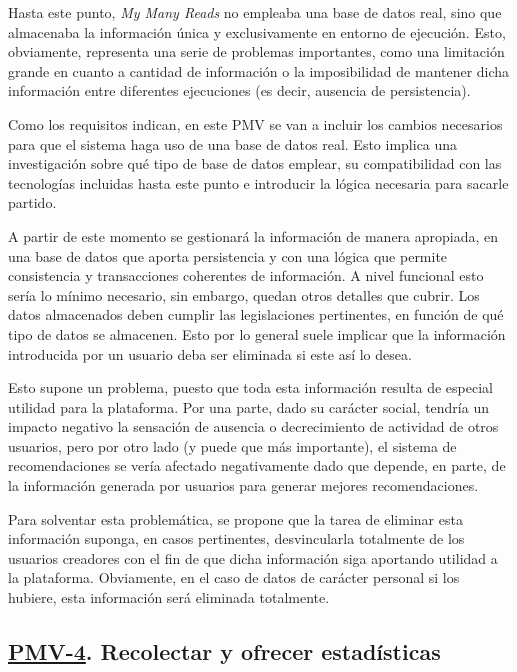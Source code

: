 Hasta este punto, \textit{My Many Reads} no empleaba una base de datos real, sino que almacenaba la información única y exclusivamente en entorno de ejecución. Esto, obviamente, representa una serie de problemas importantes, como una limitación grande en cuanto a cantidad de información o la imposibilidad de mantener dicha información entre diferentes ejecuciones (es decir, ausencia de persistencia).

Como los requisitos indican, en este PMV se van a incluir los cambios necesarios para que el sistema haga uso de una base de datos real. Esto implica una investigación sobre qué tipo de base de datos emplear, su compatibilidad con las tecnologías incluidas hasta este punto e introducir la lógica necesaria para sacarle partido.

A partir de este momento se gestionará la información de manera apropiada, en una base de datos que aporta persistencia y con una lógica que permite consistencia y transacciones coherentes de información. A nivel funcional esto sería lo mínimo necesario, sin embargo, quedan otros detalles que cubrir. Los datos almacenados deben cumplir las legislaciones pertinentes, en función de qué tipo de datos se almacenen. Esto por lo general suele implicar que la información introducida por un usuario deba ser eliminada si este así lo desea.

Esto supone un problema, puesto que toda esta información resulta de especial utilidad para la plataforma. Por una parte, dado su carácter social, tendría un impacto negativo la sensación de ausencia o decrecimiento de actividad de otros usuarios, pero por otro lado (y puede que más importante), el sistema de recomendaciones se vería afectado negativamente dado que depende, en parte, de la información generada por usuarios para generar mejores recomendaciones.

Para solventar esta problemática, se propone que la tarea de eliminar esta información suponga, en casos pertinentes, desvincularla totalmente de los usuarios creadores con el fin de que dicha información siga aportando utilidad a la plataforma. Obviamente, en el caso de datos de carácter personal si los hubiere, esta información será eliminada totalmente.

\subsection{\href{https://github.com/Anglepi/My-Many-Reads/milestone/4}{PMV-4}. Recolectar y ofrecer estadísticas}

